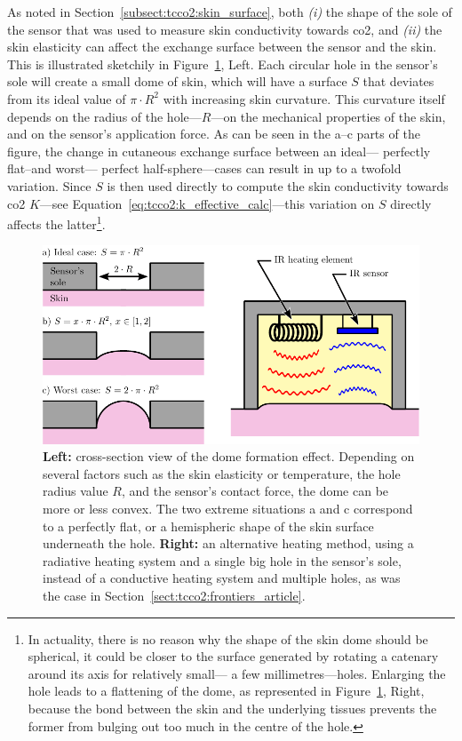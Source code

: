 As noted in Section~\ref{subsect:tcco2:skin_surface}, both \textit{(i)} the shape of the sole of the sensor that was used to measure skin conductivity towards \gls{co2}, and \textit{(ii)} the skin elasticity can affect the exchange surface between the sensor and the skin. This is illustrated sketchily in Figure~\ref{fig:conclusion:sole_shape}, Left. Each circular hole in the sensor's sole will create a small dome of skin, which will have a surface $S$ that deviates from its ideal value of $\pi\cdot R^2$ with increasing skin curvature. This curvature itself depends on the radius of the hole---$R$---on the mechanical properties of the skin, and on the sensor's application force. As can be seen in the a--c parts of the figure, the change in cutaneous exchange surface between an ideal---\ie{} perfectly flat--and worst---\ie{} perfect half-sphere---cases can result in up to a twofold variation. Since $S$ is then used directly to compute the skin conductivity towards \gls{co2} $K$---see Equation~\ref{eq:tcco2:k_effective_calc}---this variation on $S$ directly affects the latter\footnote{In actuality, there is no reason why the shape of the skin dome should be spherical, it could be closer to the surface generated by rotating a catenary around its axis for relatively small---\ie{} a few millimetres---holes. Enlarging the hole leads to a flattening of the dome, as represented in Figure~\ref{fig:conclusion:sole_shape}, Right, because the bond between the skin and the underlying tissues prevents the former from bulging out too much in the centre of the hole.}.

\begin{figure}
	\centering
	\includegraphics{1_main_matter/conclusion_figures/sole_dome_converted.pdf}
	\caption[Influence of skin elasticity on dome formation, and alternative heating scheme.]{\textbf{Left:} cross-section view of the dome formation effect. Depending on several factors such as the skin elasticity or temperature, the hole radius value $R$, and the sensor's contact force, the dome can be more or less convex. The two extreme situations a and c correspond to a perfectly flat, or a hemispheric shape of the skin surface underneath the hole. \textbf{Right:} an alternative heating method, using a radiative heating system and a single big hole in the sensor's sole, instead of a conductive heating system and multiple holes, as was the case in Section~\ref{sect:tcco2:frontiers_article}.}
	\label{fig:conclusion:sole_shape}
\end{figure}

